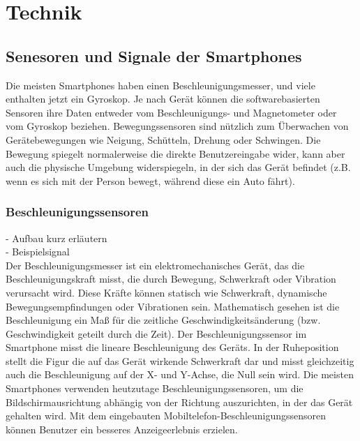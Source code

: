 %
%
%
%
\section{Technik} \label{Technik}



\subsection{Senesoren und Signale der Smartphones}

%
%
%
%
%
Die meisten Smartphones haben einen Beschleunigungsmesser, und viele enthalten jetzt ein Gyroskop. Je nach Gerät können die softwarebasierten Sensoren ihre Daten entweder vom Beschleunigungs- und Magnetometer oder vom Gyroskop beziehen. Bewegungssensoren sind nützlich zum Überwachen von Gerätebewegungen wie Neigung, Schütteln, Drehung oder Schwingen. Die Bewegung spiegelt normalerweise die direkte Benutzereingabe wider, kann aber auch die physische Umgebung widerspiegeln, in der sich das Gerät befindet (z.B. wenn es sich mit der Person bewegt, während diese ein Auto fährt).\cite{DevelopersMotionSen}



%
%
%
%


\subsubsection{Beschleunigungssensoren}
- Aufbau kurz erläutern\\
- Beispielsignal\\

Der Beschleunigungsmesser ist ein elektromechanisches Gerät, das die Beschleunigungskraft misst, die durch Bewegung, Schwerkraft oder Vibration verursacht wird. Diese Kräfte können statisch wie Schwerkraft, dynamische Bewegungsempfindungen oder Vibrationen sein. Mathematisch gesehen ist die Beschleunigung ein Maß für die zeitliche Geschwindigkeitsänderung (bzw. Geschwindigkeit geteilt durch die Zeit).
Der Beschleunigungssensor im Smartphone misst die lineare Beschleunigung des Geräts. In der Ruheposition stellt die Figur die auf das Gerät wirkende Schwerkraft dar und misst gleichzeitig auch die Beschleunigung auf der X- und Y-Achse, die Null sein wird.
Die meisten Smartphones verwenden heutzutage Beschleunigungssensoren, um die Bildschirmausrichtung abhängig von der Richtung auszurichten, in der das Gerät gehalten wird. Mit dem eingebauten Mobiltelefon-Beschleunigungssensoren können Benutzer ein besseres Anzeigeerlebnis erzielen. \cite{Sharma2020}

